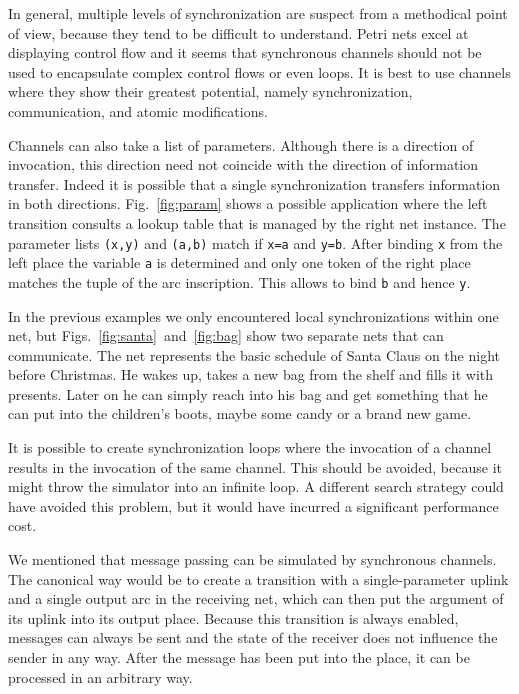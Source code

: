 In general, multiple levels of synchronization are suspect from a
methodical point of view, because they tend to be difficult to understand.
Petri nets excel at displaying control flow and it seems that
synchronous channels should not be used to encapsulate complex
control flows or even loops. It is best to use channels where they
show their greatest potential, namely synchronization,
communication, and atomic modifications.


Channels can also take a list of parameters. Although there is a
direction of invocation, this direction need not coincide with the
direction of information transfer. Indeed it is possible that a
single synchronization transfers information in both directions.
Fig.~\ref{fig:param} shows a possible application where the
left transition consults a lookup table that is managed
by the right net instance. The parameter lists \texttt{(x,y)} and
\texttt{(a,b)} match if \texttt{x=a} and \texttt{y=b}. After binding
\texttt{x} from the left place the variable \texttt{a}
is determined and only one token of the right place matches
the tuple of the arc inscription. This allows to bind \texttt{b}
and hence \texttt{y}.


In the previous examples we only encountered local synchronizations
within one net, but Figs.\ \ref{fig:santa}~and~\ref{fig:bag}
show two separate nets that can communicate. The net represents
the basic schedule of Santa Claus on the night before Christmas.
He wakes up, takes a new bag from the shelf and fills it with
presents. Later on he can simply reach into his bag
and get something that he can put into the children's boots, maybe
some candy or a brand new game.


It is possible to create synchronization loops where the invocation of a
channel results in the invocation of the same channel.
This should be avoided, because it might throw the simulator into
an infinite loop. A different search strategy could have avoided
this problem, but it would have incurred a significant performance
cost.

We mentioned that message passing can be simulated by synchronous channels.
The canonical way would be to create a transition with
a single-parameter uplink
and a single output arc in the receiving net, which can then
put the argument of its uplink into its output place. Because this
transition is always enabled, messages can always be sent and
the state of the receiver does not influence the sender in any way.
After the message has been put into the place, it can be processed
in an arbitrary way.

